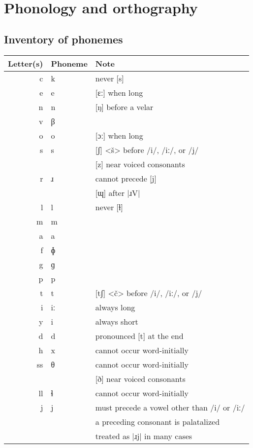 \documentclass{book}
\begin{document}
\chapter{Phonology and orthography}

\section{Inventory of phonemes}

\begin{center}
	\begin{tabular}{|r|l|l|}
	 \hline
	 Letter(s) & Phoneme & Note \\ \hline
	 c & k & never [s] \\
	 e & e & [ɛː] when long \\
	 n & n & [ŋ] before a velar \\
	 v & β & \\
	 o & o & [ɔː] when long \\
	 s & s & [ʃ] <š> before /i/, /iː/, or /j/ \\
	 & & [z] near voiced consonants \\
	 r & ɹ & cannot precede [j] \\
	 & & [ɰ] after |ɹV| \\
	 l & l & never [ɫ] \\
	 m & m & \\
	 a & a & \\
	 f & ɸ & \\
	 g & ɡ & \\
	 p & p & \\
	 t & t & [tʃ] <č> before /i/, /iː/, or /j/ \\
	 i & iː & always long \\
	 y & i & always short \\
	 d & d & pronounced [t] at the end \\
	 h & x & cannot occur word-initially \\ \hline
	 ss & θ & cannot occur word-initially \\
	 & & [ð] near voiced consonants \\
	 ll & ɬ & cannot occur word-initially \\
	 j & j & must precede a vowel other than /i/ or /iː/ \\
	 & & a preceding consonant is palatalized \\
	 & & treated as |ɹj| in many cases \\ \hline
	\end{tabular}
\end{center}
\end{document}
